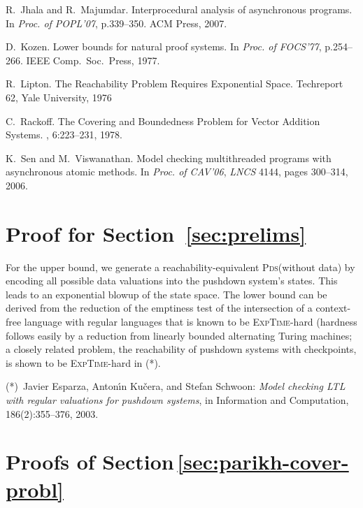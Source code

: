 \documentclass[runningheads,oribibl,]{article}
\newcommand{\pds}{\textsc{Pds}\xspace}
\newcommand{\dexptime}{\textsc{ExpTime}\xspace}
\newenvironment{proof}{\noindent{\it Proof.\hspace*{.5cm}}}{}
\begin{document}
\begin{thebibliography}{10}
R.~Jhala and R.~Majumdar.
\nb Interprocedural analysis of asynchronous programs.
\nb In {\em Proc. of POPL'07}, p.339--350. ACM Press, 2007.

D.~Kozen.
\nb Lower bounds for natural proof systems.
\nb In {\em Proc. of FOCS'77}, p.254--266. IEEE Comp.\ Soc.\ Press,
  1977.

R.~Lipton.
\nb The Reachability Problem Requires Exponential Space.
\nb  Techreport 62, Yale University, 1976

C.~Rackoff.
\nb The Covering and Boundedness Problem for Vector Addition Systems.
, 6:223–231, 1978.

K.~Sen and M.~Viswanathan.
\nb Model checking multithreaded programs with asynchronous atomic
  methods.
\nb In {\em Proc. of CAV'06}, {\em {LNCS}} 4144, pages
  300--314, 2006.

\end{thebibliography}


\clearpage
\appendix










\section{Proof for Section~\ref{sec:prelims}}
\propreachpdsdata*
\begin{proof}
  For the upper bound, we generate a reachability-equivalent
  \pds (without data)
  by encoding all possible data valuations into the pushdown system's
  states. This leads to an exponential blowup of the state space.
  The lower bound can be derived from the reduction
of the emptiness test of the intersection of a context-free language
with
 regular languages that is known to be \dexptime-hard (hardness follows
easily by a reduction from linearly bounded alternating Turing machines;
a closely related problem, the reachability of pushdown systems with
checkpoints, is shown to be \dexptime-hard
in (*).\end{proof}

{\small
(*)~Javier Esparza, Anton\'{\i}n Ku\v{c}era, and Stefan Schwoon:
\textsl{Model checking  LTL with regular valuations for pushdown systems},
in { Information and Computation}, 186(2):355--376, 2003.
}


\section{Proofs of Section\,\ref{sec:parikh-cover-probl}}
\end{document}
